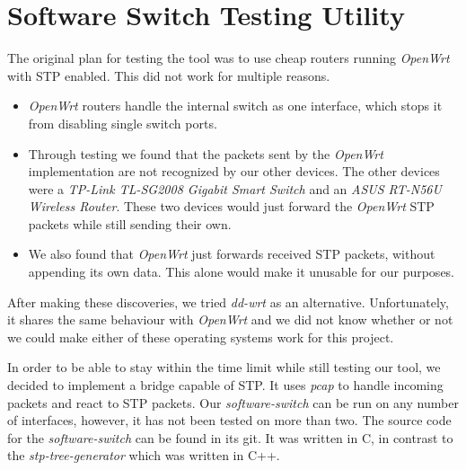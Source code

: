 \chapter{Software Switch Testing Utility}
\label{switch}
The original plan for testing the tool was to use cheap routers running \textit{OpenWrt}\cite{OpenWrt} with STP enabled.
This did not work for multiple reasons.
\begin{itemize}
    \item \textit{OpenWrt} routers handle the internal switch as one interface, which stops it from disabling single switch ports.
    \item Through testing we found that the packets sent by the \textit{OpenWrt} implementation are not recognized by our other devices.
    The other devices were a \textit{TP-Link TL-SG2008 Gigabit Smart Switch} and an \textit{ASUS RT-N56U Wireless Router}.
    These two devices would just forward the \textit{OpenWrt} STP packets while still sending their own.
    \item We also found that \textit{OpenWrt} just forwards received STP packets, without appending its own data.
    This alone would make it unusable for our purposes.
\end{itemize}

After making these discoveries, we tried \textit{dd-wrt}\cite{dd-wrt} as an alternative.
Unfortunately, it shares the same behaviour with \textit{OpenWrt} and we did not know whether or not we could make either of these operating systems work for this project.

In order to be able to stay within the time limit while still testing our tool, we decided to implement a bridge capable of STP.
It uses \textit{pcap} to handle incoming packets and react to STP packets.
Our \textit{software-switch} can be run on any number of interfaces, however, it has not been tested on more than two.
The source code for the \textit{software-switch} can be found in its git\cite{soft-switch}.
It was written in C, in contrast to the \textit{stp-tree-generator} which was written in C++.

